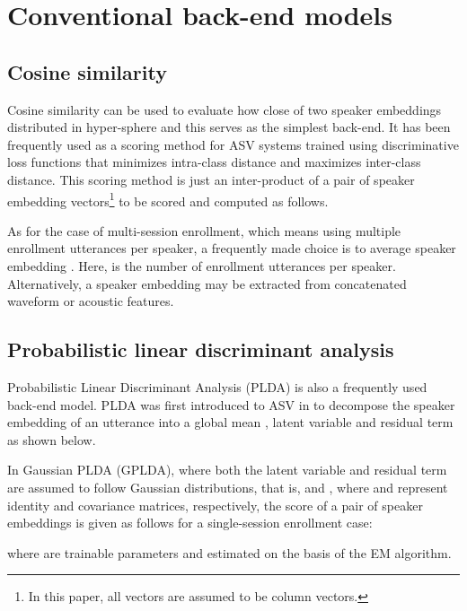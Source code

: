 \documentclass{article}
\begin{document}
\section{Conventional back-end models}
\vspace{-1mm}
\subsection{Cosine similarity}
\vspace{-1mm}

Cosine similarity can be used to evaluate how close of two speaker embeddings distributed in hyper-sphere and this serves as the simplest back-end. It has been frequently used as a scoring method for ASV systems trained using discriminative loss functions \cite{Li2017-DS, Liu2017-Angular, Wang2018-LMCL} that minimizes intra-class distance and maximizes inter-class distance. This scoring method is just an inter-product of a pair of speaker embedding vectors\footnote{In this paper, all vectors are assumed to be column vectors.} to be scored and computed as follows.

As for the case of multi-session enrollment, which means using multiple enrollment utterances per speaker, 
a frequently made choice is to average speaker embedding . Here,  is the number of enrollment utterances per speaker. Alternatively, a speaker embedding may be extracted from concatenated waveform or acoustic features.
\vspace{-1mm}


\subsection{Probabilistic linear discriminant analysis}
\vspace{-1mm}

Probabilistic Linear Discriminant Analysis (PLDA) is also a frequently used back-end model. PLDA was first introduced to ASV in \cite{first_plda} to decompose the speaker embedding of an utterance  into a global mean , latent variable  and residual term  as shown below.

In Gaussian PLDA (GPLDA), where both the latent variable  and residual term  are assumed to follow Gaussian distributions, that is,  and , where  and  represent identity and covariance matrices, respectively, the score of a pair of speaker embeddings is given as follows for a single-session enrollment case:

where  are trainable parameters and estimated on the basis of the EM algorithm. 
\end{document}
